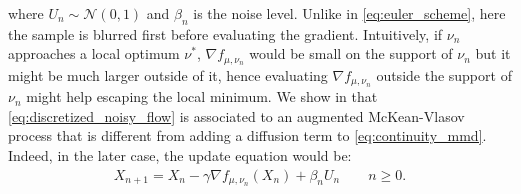 where $U_n \sim \mathcal{N}(0,1)$ and $\beta_n$ is the noise level. Unlike in \cref{eq:euler_scheme}, here the sample is blurred first before evaluating the gradient.
Intuitively, if $\nu_n$ approaches a local optimum $\nu^{*}$, $ \nabla f_{\mu,\nu_n}$ would be small on the support of $\nu_n$ but it might be much larger outside of it, hence evaluating $\nabla f_{\mu,\nu_n}$ outside the support of $\nu_n$ might help escaping the local minimum. We show in  that \cref{eq:discretized_noisy_flow} is associated to an augmented McKean-Vlasov process that is different from adding a diffusion term to \cref{eq:continuity_mmd}. Indeed, in the later case, the update equation would be:
\begin{align}\label{eq:diffusion}
	X_{n+1} = X_{n} -\gamma \nabla f_{\mu,\nu_n}(X_n)+ \beta_n U_n \qquad n\geq 0.
\end{align}
